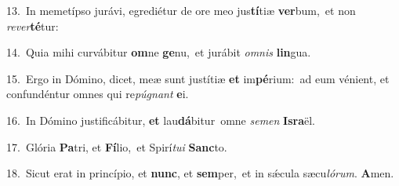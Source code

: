 {\numbfont\textcolor{\numbcolor}{13.}}~In memetípso jurávi, egrediétur de ore meo jus\-\textbf{tí}\-tiæ \textbf{ver}\-bum,~\star et non \textit{re}\-\textit{ver}\textbf{té}tur:\par
{\numbfont\textcolor{\numbcolor}{14.}}~Quia mihi curvábitur \textbf{om}\-ne \textbf{ge}\-nu,~\star et jurábit \textit{om}\-\textit{nis} \textbf{lin}\-gua.\par
{\numbfont\textcolor{\numbcolor}{15.}}~Ergo in Dómino, dicet, meæ sunt justítiæ \textbf{et} im\-\textbf{pé}\-rium:~\star ad eum vénient, et confundéntur omnes qui re\-\textit{pú}\-\textit{gnant} \textbf{e}\-i.\par
{\numbfont\textcolor{\numbcolor}{16.}}~In Dómino justificábitur, \textbf{et} lau\-\textbf{dá}\-bitur~\star omne \textit{se}\-\textit{men} \textbf{Is}\-\textbf{ra}ël.\par
{\numbfont\textcolor{\numbcolor}{17.}}~Glória \textbf{Pa}\-tri, et \textbf{Fí}\-lio,~\star et Spirí\-\textit{tu}\-\textit{i} \textbf{Sanc}\-to.\par
{\numbfont\textcolor{\numbcolor}{18.}}~Sicut erat in princípio, et \textbf{nunc}\-, et \textbf{sem}\-per,~\star et in sǽcula sæcu\-\textit{ló}\-\textit{rum}. \textbf{A}\-men.\par
